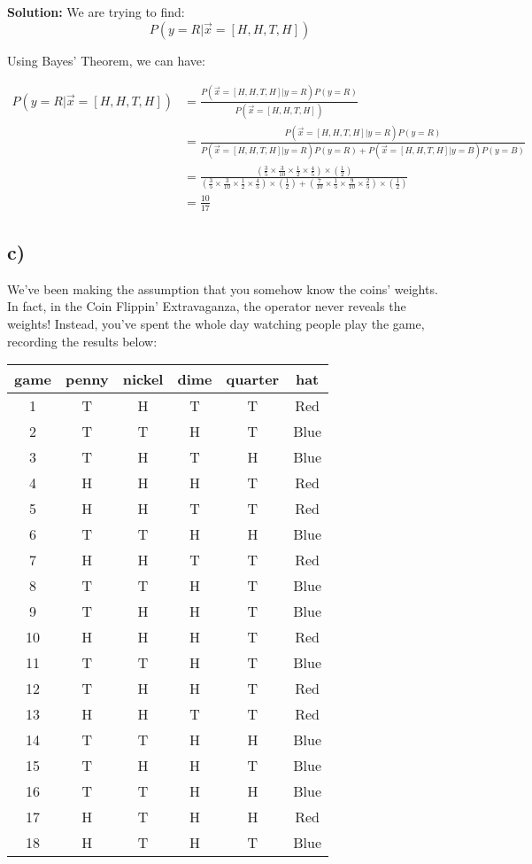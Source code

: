 \documentclass[a4paper]{article}
\begin{document}
\textbf{Solution:}
We are trying to find: 
$$P(y = R | \vec{x} = [H,H,T,H])$$

Using Bayes' Theorem, we can have: 

\begin{align*}
     P(y = R|\vec{x} = [H,H,T,H]) &= \frac{P(\vec{x} = [H,H,T,H] | y = R) P(y=R)}{P(\vec{x} = [H,H,T,H])} \\
     &= \frac{P(\vec{x} = [H,H,T,H] | y = R) P(y=R)}{P(\vec{x} = [H,H,T,H] | y = R) P(y=R) + P(\vec{x} = [H,H,T,H] | y = B) P(y=B)} \\
     &= \frac{(\frac{3}{5} \times \frac{3}{10} \times \frac{1}{2} \times \frac{4}{5}) \times (\frac{1}{2})}{(\frac{3}{5} \times \frac{3}{10} \times \frac{1}{2} \times \frac{4}{5})  \times (\frac{1}{2}) + (\frac{7}{10} \times \frac{1}{5}
     \times \frac{9}{10} \times \frac{2}{5})  \times (\frac{1}{2}) } \\
     &= \frac{10}{17}
\end{align*}

\subsection*{c)}
We've been making the assumption that you somehow know the coins' weights. In fact, in the Coin Flippin' Extravaganza, the operator never reveals the weights! Instead, you've spent the whole day watching people play the game, recording the results below:
\begin{center}
\begin{tabular}{ c | c c c c | c }
 game & penny & nickel & dime & quarter & hat \\ 
 \hline
 1 & T & H & T & T & Red \\
 2 & T & T & H & T & Blue \\
 3 & T & H & T & H & Blue \\
 4 & H & H & H & T & Red \\
 5 & H & H & T & T & Red \\
 6 & T & T & H & H & Blue \\
 7 & H & H & T & T & Red \\
 8 & T & T & H & T & Blue \\
 9 & T & H & H & T & Blue \\
 10 & H & H & H & T & Red \\
 11 & T & T & H & T & Blue \\
 12 & T & H & H & T & Red \\
 13 & H & H & T & T & Red \\
 14 & T & T & H & H & Blue \\
 15 & T & H & H & T & Blue \\
 16 & T & T & H & H & Blue \\
 17 & H & T & H & H & Red \\
 18 & H & T & H & T & Blue
\end{tabular}
\end{center}
\end{document}
